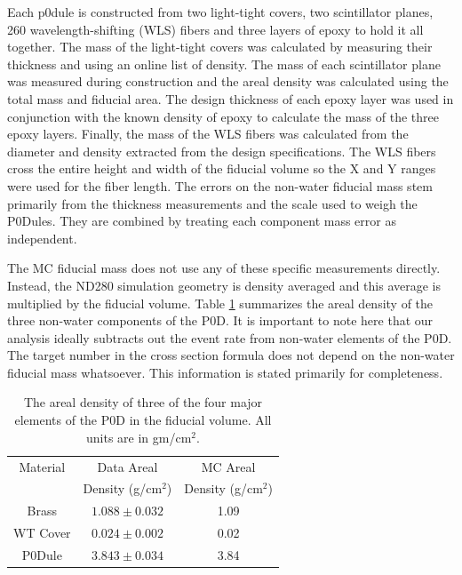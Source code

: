 Each p0dule is constructed from two light-tight covers, two scintillator planes, 260 wavelength-shifting (WLS) fibers and three layers of epoxy to hold it all together. The mass of the light-tight covers was calculated by measuring their thickness and using an online list of density. The mass of each scintillator plane was measured during construction and the areal density was calculated using the total mass and fiducial area. The design thickness of each epoxy layer was used in conjunction with the known density of epoxy to calculate the mass of the three epoxy layers. Finally, the mass of the WLS fibers was calculated from the diameter and density extracted from the design specifications. The WLS fibers cross the entire height and width of the fiducial volume so the X and Y ranges were used for the fiber length. The errors on the non-water fiducial mass stem primarily from the thickness measurements and the scale used to weigh the P0Dules. They are combined by treating each component mass error as independent.

The MC fiducial mass does not use any of these specific measurements directly. Instead, the ND280 simulation geometry is density averaged and this average is multiplied by the fiducial volume. Table \ref{tab:aden} summarizes the areal density of the three non-water components of the P0D. It is important to note here that our analysis ideally subtracts out the event rate from non-water elements of the P0D. The target number in the cross section formula does not depend on the non-water fiducial mass whatsoever. This information is stated primarily for completeness.

\begin{table}[h]
\caption{The areal density of three of the four major elements of the P0D in the fiducial volume. All units are in gm/cm$^2$.}
\centering
\begin{tabular}{ccc}
\toprule
Material & Data Areal & MC Areal\\
& Density (g/cm$^2$) & Density (g/cm$^2$) \\
\midrule
Brass & $1.088 \pm 0.032$ & 1.09 \\
WT Cover & $0.024 \pm 0.002$ & 0.02 \\
P0Dule & $3.843 \pm 0.034$ & 3.84 \\
\bottomrule
\end{tabular} 
\label{tab:aden} 
\end{table}

